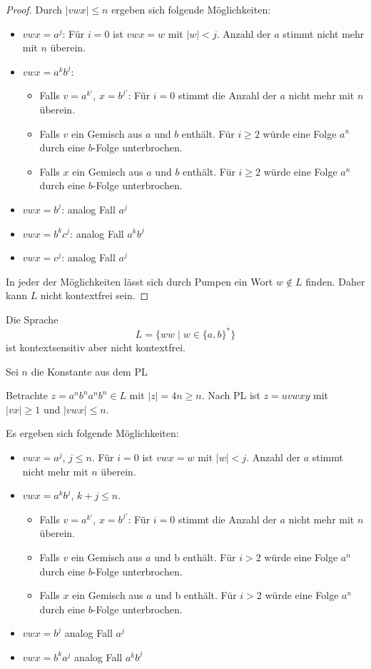 {\begin{proof}
  Durch $|vwx| \le n$ ergeben sich folgende Möglichkeiten:
  \begin{itemize}
  \item $vwx = a^j$: 
    Für $i=0$ ist $vwx=w$ mit $|w| < j$.
    Anzahl der $a$ stimmt nicht mehr mit $n$ überein.
  \item $vwx = a^kb^j$:
    \begin{itemize}
    \item Falls $v = a^{k'}$, $x = b^{j'}$: Für $i=0$ stimmt die Anzahl der $a$ nicht mehr mit $n$ überein.
    \item Falls $v$ ein Gemisch aus $a$ und $b$ enthält.
      Für $i\ge 2$ würde eine Folge $a^n$ durch eine $b$-Folge unterbrochen.
    \item Falls $x$ ein Gemisch aus $a$ und $b$ enthält.
      Für $i \ge2$ würde eine Folge $a^n$ durch eine $b$-Folge unterbrochen.
    \end{itemize}
  \item $vwx = b^j$: analog Fall $a^j$
  \item $vwx = b^kc^j$: analog Fall $a^kb^j$
  \item $vwx = c^j$: analog Fall $a^j$
  \end{itemize}
  In jeder der Möglichkeiten lässt sich durch Pumpen ein Wort $w \not \in L$ finden.
  Daher kann $L$ nicht kontextfrei sein.
\end{proof}

\begin{Bsp} Die Sprache
  \begin{displaymath}
    L = \{ww \mid w \in \{a,b\}^*\}
  \end{displaymath}
  ist kontextsensitiv aber nicht kontextfrei.

  Sei $n$ die Konstante aus dem PL

  Betrachte $z = a^nb^na^nb^n \in L$ mit $|z| = 4n \ge n$.
  Nach PL ist $z = uvwxy$ mit $|vx| \ge 1$ und $|vwx| \le n$.

  Es ergeben sich folgende Möglichkeiten:
  \begin{itemize}
  \item $vwx = a^j$, $j \le n$.
    Für $i=0$ ist $vwx=w$ mit $|w| < j$.
    Anzahl der $a$ stimmt nicht mehr mit $n$ überein.
  \item $vwx = a^kb^j$, $k+j \le n$.

    \begin{itemize}
    \item Falls $v = a^{k'}$, $x = b^{j'}$: Für $i=0$ stimmt die Anzahl der $a$ nicht mehr mit $n$ überein.
    \item Falls $v$ ein Gemisch aus $a$ und b enthält.
      Für $i>2$ würde eine Folge $a^n$ durch eine $b$-Folge unterbrochen.
    \item Falls $x$ ein Gemisch aus $a$ und b enthält.
      Für $i>2$ würde eine Folge $a^n$ durch eine $b$-Folge unterbrochen.
    \end{itemize}
  \item $vwx = b^j$ analog Fall $a^j$
  \item $vwx = b^ka^j$ analog Fall $a^kb^j$
  \end{itemize}
\end{Bsp}


}




